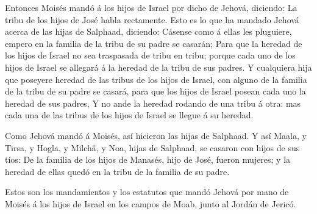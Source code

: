  Entonces Moisés mandó á los hijos de Israel por dicho de
Jehová, diciendo: La tribu de los hijos de José habla rectamente.
 Esto es lo que ha mandado Jehová acerca de las hijas de
Salphaad, diciendo: Cásense como á ellas les pluguiere, empero en la
familia de la tribu de su padre se casarán;  Para que la
heredad de los hijos de Israel no sea traspasada de tribu en tribu;
porque cada uno de los hijos de Israel se allegará á la heredad de la
tribu de sus padres.  Y cualquiera hija que poseyere
heredad de las tribus de los hijos de Israel, con alguno de la familia
de la tribu de su padre se casará, para que los hijos de Israel posean
cada uno la heredad de sus padres,  Y no ande la heredad
rodando de una tribu á otra: mas cada una de las tribus de los hijos de
Israel se llegue á su heredad.

 Como Jehová mandó á Moisés, así hicieron las hijas de
Salphaad.  Y así Maala, y Tirsa, y Hogla, y Milchâ, y
Noa, hijas de Salphaad, se casaron con hijos de sus tíos:
 De la familia de los hijos de Manasés, hijo de José,
fueron mujeres; y la heredad de ellas quedó en la tribu de la familia de
su padre.

 Estos son los mandamientos y los estatutos que mandó
Jehová por mano de Moisés á los hijos de Israel en los campos de Moab,
junto al Jordán de Jericó.
